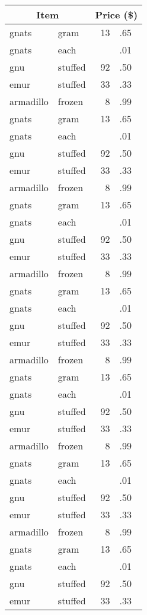 \begin{tabular}{llr@{}l}
\hline
\multicolumn{2}{c}{{\small Item}}
& \multicolumn{2}{c}{{\small Price (\$)}} \\
\hline
gnats     & gram    & 13&.65 \\
gnats     & each    &   &.01 \\
gnu       & stuffed & 92&.50 \\
emur      & stuffed & 33&.33 \\
armadillo & frozen  &  8&.99 \\
gnats     & gram    & 13&.65 \\
gnats     & each    &   &.01 \\
gnu       & stuffed & 92&.50 \\
emur      & stuffed & 33&.33 \\
armadillo & frozen  &  8&.99 \\
gnats     & gram    & 13&.65 \\
gnats     & each    &   &.01 \\
gnu       & stuffed & 92&.50 \\
emur      & stuffed & 33&.33 \\
armadillo & frozen  &  8&.99 \\
gnats     & gram    & 13&.65 \\
gnats     & each    &   &.01 \\
gnu       & stuffed & 92&.50 \\
emur      & stuffed & 33&.33 \\
armadillo & frozen  &  8&.99 \\
gnats     & gram    & 13&.65 \\
gnats     & each    &   &.01 \\
gnu       & stuffed & 92&.50 \\
emur      & stuffed & 33&.33 \\
armadillo & frozen  &  8&.99 \\
gnats     & gram    & 13&.65 \\
gnats     & each    &   &.01 \\
gnu       & stuffed & 92&.50 \\
emur      & stuffed & 33&.33 \\
armadillo & frozen  &  8&.99 \\
gnats     & gram    & 13&.65 \\
gnats     & each    &   &.01 \\
gnu       & stuffed & 92&.50 \\
emur      & stuffed & 33&.33 \\
\hline
\end{tabular}
